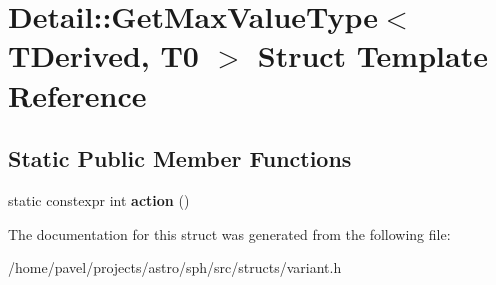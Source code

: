\hypertarget{structDetail_1_1GetMaxValueType_3_01TDerived_00_01T0_01_4}{}\section{Detail\+:\+:Get\+Max\+Value\+Type$<$ T\+Derived, T0 $>$ Struct Template Reference}
\label{structDetail_1_1GetMaxValueType_3_01TDerived_00_01T0_01_4}
\subsection*{Static Public Member Functions}
\begin{DoxyCompactItemize}
\item 
\hypertarget{structDetail_1_1GetMaxValueType_3_01TDerived_00_01T0_01_4_ae95a604c45e4774dc77c2d6b4fd0abf4}{}\label{structDetail_1_1GetMaxValueType_3_01TDerived_00_01T0_01_4_ae95a604c45e4774dc77c2d6b4fd0abf4} 
static constexpr int {\bfseries action} ()
\end{DoxyCompactItemize}


The documentation for this struct was generated from the following file\+:\begin{DoxyCompactItemize}
\item 
/home/pavel/projects/astro/sph/src/structs/variant.\+h\end{DoxyCompactItemize}
